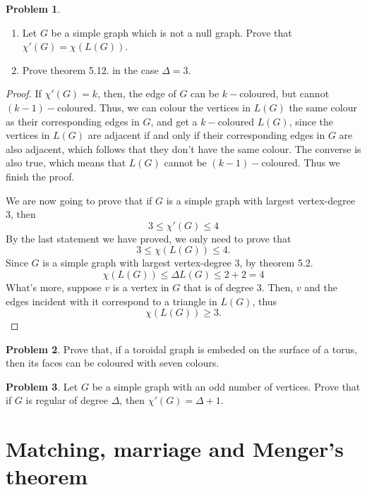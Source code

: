 \documentclass[a4paper,11pt]{article}%
\theoremstyle{remark}
\theoremstyle{definition}
\newtheorem{problem}{Problem}[subsection]
\begin{document}
\begin{problem}
    \begin{enumerate}
        \item Let $G$ be a simple graph which is not a null graph. Prove that $\chi'(G)=\chi(L(G))$.
        \item Prove theorem 5.12. in the case $\Delta=3.$
    \end{enumerate}
    \begin{proof}
       If $\chi'(G)=k$, then, the edge of $G$ can be $k-$coloured, but cannot $(k-1)-$coloured.
       Thus, we can colour the vertices in $L(G)$ the same colour as their corresponding edges in $G$, and get a $k-$coloured 
       $L(G)$, since the vertices in $L(G)$ are adjacent if and only if their corresponding edges in $G$ are also adjacent, which 
       follows that they don't have the same colour. The converse is also true, which means that $L(G)$ cannot be $(k-1)-$coloured.
       Thus we finish the proof.

       We are now going to prove that if $G$ is a simple graph with largest vertex-degree 3, then 
       \[3\leq\chi'(G) \leq 4\] 
       By the last statement we have proved, we only need to prove that 
       \[3\leq\chi(L(G))\leq 4.\]
       Since $G$ is a simple graph with largest vertex-degree 3, by theorem 5.2.
\[\chi(L(G))\leq \Delta L(G)\leq 2+2=4\]
What's more, suppose $v$ is a vertex in $G$ that is of degree 3. Then, $v$ and the edges incident with it correspond to 
a triangle in $L(G)$, thus 
\[\chi(L(G))\geq 3.\]
    \end{proof}
\end{problem}
\begin{problem}
    Prove that, if a toroidal graph is embeded on the surface of a torus, then its faces can be coloured with seven colours.
\end{problem}
\begin{problem}
    Let $G$ be a simple graph with an odd number of vertices. Prove that if $G$ is regular of degree $\Delta$, then $\chi'(G)=\Delta+1$.
\end{problem}
\section{Matching, marriage and Menger's theorem}
\end{document}
